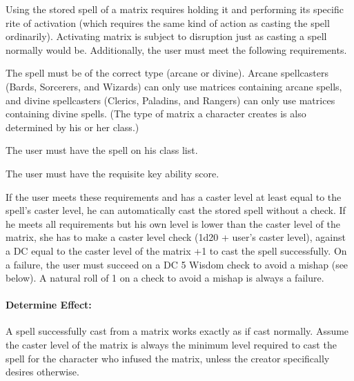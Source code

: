 Using the stored spell of a matrix requires holding it and performing its specific rite of activation (which requires the same kind of action as casting the spell ordinarily).
Activating matrix is subject to disruption just as casting a spell normally would be.
Additionally, the user must meet the following requirements.
\begin{list}{}{\leftmargin=1em}
 \item The spell must be of the correct type (arcane or divine). Arcane spellcasters (Bards, Sorcerers, and Wizards) can only use matrices containing arcane spells, and divine spellcasters (Clerics, Paladins, and Rangers) can only use matrices containing divine spells. (The type of matrix a character creates is also determined by his or her class.)
 \item The user must have the spell on his class list.
 \item The user must have the requisite key ability score.
\end{list}
If the user meets these requirements and has a caster level at least equal to the spell's caster level, he can automatically cast the stored spell without a check. 
If he meets all requirements but his own level is lower than the caster level of the matrix, she has to make a caster level check (1d20 + user's caster level), against a DC equal to the caster level of the matrix +1 to cast the spell successfully. 
On a failure, the user must succeed on a DC 5 Wisdom check to avoid a mishap (see below).
A natural roll of 1 on a check to avoid a mishap is always a failure.
\paragraph{Determine Effect:} A spell successfully cast from a matrix works exactly as if cast normally. 
Assume the caster level of the matrix is always the minimum level required to cast the spell for the character who infused the matrix, unless the creator specifically desires
otherwise.
